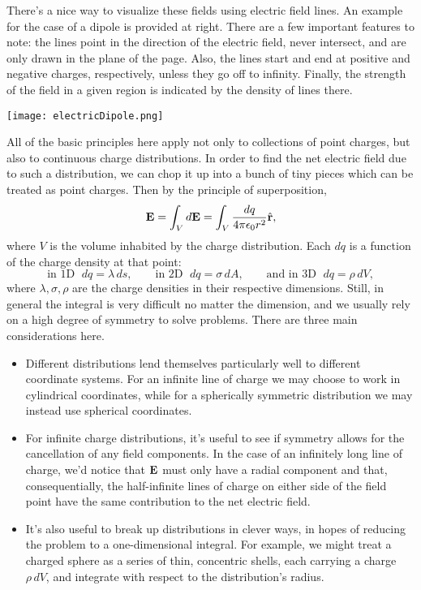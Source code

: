 \documentclass[../p051main.tex]{subfiles}
\begin{document}
\parbox{0.55\textwidth}{
    There's a nice way to visualize these fields using electric field lines.
    An example for the case of a dipole is provided at right.
    There are a few important features to note: the lines point in the direction of the electric field, never intersect, and are only drawn in the plane of the page.
    Also, the lines start and end at positive and negative charges, respectively, unless they go off to infinity.
    Finally, the strength of the field in a given region is indicated by the density of lines there.
}\parbox{0.45\textwidth}{
    \quad\;
    \texttt{[image: electricDipole.png]}
}

All of the basic principles here apply not only to collections of point charges, but also to continuous charge distributions.
In order to find the net electric field due to such a distribution, we can chop it up into a bunch of tiny pieces which can be treated as point charges.
Then by the principle of superposition,
\[ \mathbf{E} = \int_V d\mathbf{E} = \int_V \frac{dq}{4\pi\epsilon_0 r^2} \hat{\mathbf{r}}, \]
where $V$ is the volume inhabited by the charge distribution.
Each $dq$ is a function of the charge density at that point:
\[ \text{in 1D }\; dq = \lambda \,ds, \qquad \text{in 2D }\; dq = \sigma \,dA, \qquad \text{and in 3D }\; dq = \rho \,dV, \]
where $\lambda,\sigma,\rho$ are the charge densities in their respective dimensions.
Still, in general the integral is very difficult no matter the dimension, and we usually rely on a high degree of symmetry to solve problems.
There are three main considerations here.
\begin{itemize}
    \item Different distributions lend themselves particularly well to different coordinate systems.
    For an infinite line of charge we may choose to work in cylindrical coordinates, while for a spherically symmetric distribution we may instead use spherical coordinates.

    \item For infinite charge distributions, it's useful to see if symmetry allows for the cancellation of any field components.
    In the case of an infinitely long line of charge, we'd notice that $\mathbf{E}$ must only have a radial component and that, consequentially, the half-infinite lines of charge on either side of the field point have the same contribution to the net electric field.

    \item It's also useful to break up distributions in clever ways, in hopes of reducing the problem to a one-dimensional integral.
    For example, we might treat a charged sphere as a series of thin, concentric shells, each carrying a charge $\rho \,dV$, and integrate with respect to the distribution's radius.
\end{itemize}
\end{document}
